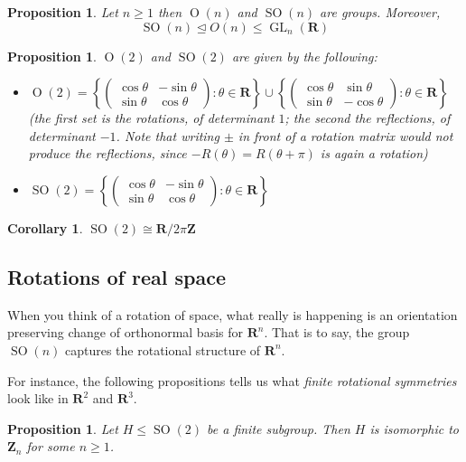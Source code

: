 \documentclass[12pt]{article}
\numberwithin{equation}{subsection}
\newtheorem{prop}[subsection]{Proposition}
\newtheorem{corollary}[subsection]{Corollary}
\theoremstyle{note}
\newcommand{\GL}{\operatorname{GL}}
\newcommand{\Or}{\operatorname{O}}
\newcommand{\SO}{\operatorname{SO}}
\newcommand{\nrml}{\trianglelefteq}
\begin{document}
\begin{prop}\label{On-group}
	Let $n\geq 1$ then $\Or(n)$ and $\SO(n)$ are groups. Moreover, \[\SO(n)\nrml O(n)\leq \GL_n(\mathbf{R})\]
\end{prop}

\begin{prop} $\Or(2)$ and $\SO(2)$ are given by the following:	\begin{itemize}
	\item $\Or(2)=\left\{ \begin{pmatrix} \cos\theta & -\sin\theta \\ \sin\theta & \cos\theta \end{pmatrix} : \theta \in \mathbf{R}\right\}\cup \left\{ \begin{pmatrix} \cos\theta & \sin\theta \\ \sin\theta & -\cos\theta \end{pmatrix} : \theta \in \mathbf{R}\right\}$ \quad (the first set is the rotations, of determinant $1$; the second the reflections, of determinant $-1$. Note that writing $\pm$ in front of a rotation matrix would \textit{not} produce the reflections, since $-R(\theta)=R(\theta+\pi)$ is again a rotation)
	
	\item $\SO(2)=\left\{ \begin{pmatrix} \cos\theta & -\sin\theta \\ \sin\theta & \cos\theta \end{pmatrix} : \theta \in \mathbf{R}\right\}$
	\end{itemize}
\end{prop}

\begin{corollary}
	$\SO(2)\cong \mathbf{R}/2\pi\mathbf{Z}$
\end{corollary}

\subsection{Rotations of real space}
When you think of a rotation of space, what really is happening is an orientation preserving change of orthonormal basis for $\mathbf{R}^n$. That is to say, the group $\SO(n)$ captures the rotational structure of $\mathbf{R}^n$. 

For instance, the following propositions tells us what \textit{finite rotational symmetries} look like in $\mathbf{R}^2$ and $\mathbf{R}^3$. 


\begin{prop}
	Let $H\leq \SO(2)$ be a finite subgroup. Then $H$ is isomorphic to $\mathbf{Z}_n$ for some $n\geq 1$.
\end{prop}
\end{document}
